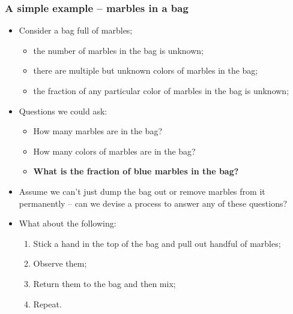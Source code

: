\documentclass[aspectratio=169]{beamer}
\theoremstyle{principle}
\begin{document}
\begin{frame}
\frametitle{A simple example -- marbles in a bag}

\begin{itemize}
\item Consider a bag full of marbles;
\begin{itemize}
\item the number of marbles in the bag is unknown;
\item there are multiple but unknown colors of marbles in the bag;
\item the fraction of any particular color of marbles in the bag is unknown;
\end{itemize}
\bigskip
\item Questions we could ask:
\begin{itemize}
\item How many marbles are in the bag?
\item How many colors of marbles are in the bag?
\item \textbf{What is the fraction of blue marbles in the bag?}
\end{itemize}
\bigskip
\item Assume we can't just dump the bag out or remove marbles from it permanently -- can we devise a process to answer any of these questions?
\bigskip
\item[]\color{white} What about the following:
\begin{enumerate}
\item[]\color{white} Stick a hand in the top of the bag and pull out handful of marbles;
\item[]\color{white} Observe them;
\item[]\color{white} Return them to the bag and then mix;
\item[]\color{white} Repeat.
\end{enumerate} 
\end{itemize}

\end{frame}
\end{document}
